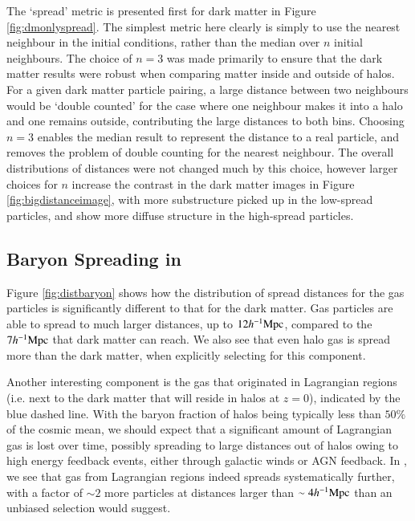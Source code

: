 The `spread' metric is presented first for dark matter in Figure
\ref{fig:dmonlyspread}. The simplest metric here clearly is simply to use the
nearest neighbour in the initial conditions, rather than the median over $n$
initial neighbours. The choice of $n=3$ was made primarily to ensure that the
dark matter results were robust when comparing matter inside and outside of
halos. For a given dark matter particle pairing, a large distance between two
neighbours would be `double counted' for the case where one neighbour makes
it into a halo and one remains outside, contributing the large distances to
both bins. Choosing $n=3$ enables the median result to represent the distance
to a real particle, and removes the problem of double counting for the
nearest neighbour. The overall distributions of distances were not changed
much by this choice, however larger choices for $n$ increase the contrast in
the dark matter images in Figure \ref{fig:bigdistanceimage}, with more
substructure picked up in the low-spread particles, and show more diffuse
structure in the high-spread particles.

\subsection{Baryon Spreading in \simba{}}

Figure \ref{fig:distbaryon} shows how the distribution of spread distances
for the gas particles is significantly different to that for the dark matter.
Gas particles are able to spread to much larger distances, up to $12h^{-1}{\rm Mpc}{}$,
compared to the $7h^{-1}{\rm Mpc}{}$ that dark matter can reach. We also see that even halo gas is spread more than the dark matter, when explicitly selecting for this
component.

Another interesting 
component is the gas that originated in
Lagrangian regions (i.e. next to the dark matter that will reside in halos at $z=0$), indicated by the blue dashed line. With the baryon fraction of halos being typically less than $50\%$ of
the cosmic mean, we should expect that a 
significant amount of Lagrangian gas is lost over time, possibly spreading to large distances out of halos owing to 
high energy feedback events, either through galactic winds or AGN feedback. In \simba{}, we see that gas from Lagrangian regions indeed spreads systematically
further, 
with a factor of $\sim 2$ more particles at
distances larger than $\sim 4 h^{-1}{\rm Mpc}{}$ than an unbiased selection would
suggest.

